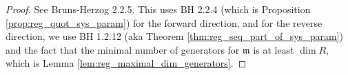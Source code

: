 \begin{proof}
  See Bruns-Herzog 2.2.5. This uses BH 2.2.4 
  (which is Proposition \ref{prop:reg_quot_sys_param}) for the forward
  direction,
  and for the reverse direction, we use BH 1.2.12 
  (aka Theorem \ref{thm:reg_seq_part_of_sys_param}) 
  and the fact that
  the minimal number of generators for $\mathfrak{m}$ is at least
  $\dim R$, which is Lemma \ref{lem:reg_maximal_dim_generators}.
\end{proof}

